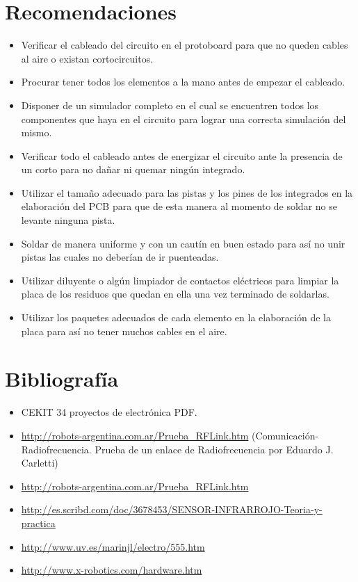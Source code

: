 \documentclass[a4paper,11pt]{article}
\begin{document}
\section{Recomendaciones}
\begin{itemize}
	\item Verificar el cableado del circuito en el protoboard para que no queden cables al aire o existan cortocircuitos.
	\item Procurar tener todos los elementos a la mano antes de empezar el cableado.
	\item Disponer de un simulador completo en el cual se encuentren todos los componentes que haya en el circuito para lograr una correcta simulación del mismo.
	\item Verificar todo el cableado antes de energizar el circuito ante la presencia de un corto para no dañar ni quemar ningún integrado.
	\item Utilizar el tamaño adecuado para las pistas y los pines de los integrados en la elaboración del PCB para que de esta manera al momento de soldar no se levante ninguna pista.
	\item Soldar de manera uniforme y con un cautín en buen estado para así no unir pistas las cuales no deberían de ir puenteadas.
	\item Utilizar diluyente o algún limpiador de contactos eléctricos para limpiar la placa de los residuos que quedan en ella una vez terminado de soldarlas.
	\item Utilizar los paquetes adecuados de cada elemento en la elaboración de la placa para así no tener muchos cables en el aire.
\end{itemize}

\section{Bibliografía}
\begin{itemize}
	\item CEKIT 34 proyectos de electrónica PDF.
	\item \url{http://robots-argentina.com.ar/Prueba_RFLink.htm} (Comunicación-Radiofrecuencia. Prueba de un enlace de Radiofrecuencia por Eduardo J. Carletti)
	\item \url{http://robots-argentina.com.ar/Prueba_RFLink.htm}
	\item \url{http://es.scribd.com/doc/3678453/SENSOR-INFRARROJO-Teoria-y-practica}
	\item \url{http://www.uv.es/marinjl/electro/555.htm}
	\item \url{http://www.x-robotics.com/hardware.htm}
\end{itemize}
\end{document}
